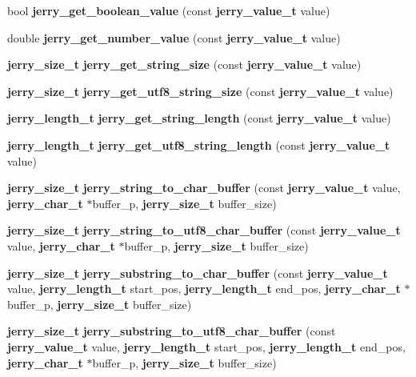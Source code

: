 \begin{DoxyCompactItemize}
\item 
bool \textbf{ jerry\+\_\+get\+\_\+boolean\+\_\+value} (const \textbf{ jerry\+\_\+value\+\_\+t} value)
\item 
\mbox{\label{group___core_ga329c9cb8d7a57c9b643432f729b88438}} 
double {\bfseries jerry\+\_\+get\+\_\+number\+\_\+value} (const \textbf{ jerry\+\_\+value\+\_\+t} value)
\item 
\textbf{ jerry\+\_\+size\+\_\+t} \textbf{ jerry\+\_\+get\+\_\+string\+\_\+size} (const \textbf{ jerry\+\_\+value\+\_\+t} value)
\item 
\mbox{\label{group___core_ga2fbf17ba5843f38650df1130c2d9766d}} 
\textbf{ jerry\+\_\+size\+\_\+t} {\bfseries jerry\+\_\+get\+\_\+utf8\+\_\+string\+\_\+size} (const \textbf{ jerry\+\_\+value\+\_\+t} value)
\item 
\mbox{\label{group___core_ga496e981eaa15cd116d2df6b301f20d35}} 
\textbf{ jerry\+\_\+length\+\_\+t} {\bfseries jerry\+\_\+get\+\_\+string\+\_\+length} (const \textbf{ jerry\+\_\+value\+\_\+t} value)
\item 
\mbox{\label{group___core_gad23af5d2cb6438385239b44e9d99dcc5}} 
\textbf{ jerry\+\_\+length\+\_\+t} {\bfseries jerry\+\_\+get\+\_\+utf8\+\_\+string\+\_\+length} (const \textbf{ jerry\+\_\+value\+\_\+t} value)
\item 
\mbox{\label{group___core_ga1a36fc4a884499edb2e7ad181b518c89}} 
\textbf{ jerry\+\_\+size\+\_\+t} {\bfseries jerry\+\_\+string\+\_\+to\+\_\+char\+\_\+buffer} (const \textbf{ jerry\+\_\+value\+\_\+t} value, \textbf{ jerry\+\_\+char\+\_\+t} $\ast$buffer\+\_\+p, \textbf{ jerry\+\_\+size\+\_\+t} buffer\+\_\+size)
\item 
\mbox{\label{group___core_ga7fa3dfcfa1a0c2b7353448b1e1ea9001}} 
\textbf{ jerry\+\_\+size\+\_\+t} {\bfseries jerry\+\_\+string\+\_\+to\+\_\+utf8\+\_\+char\+\_\+buffer} (const \textbf{ jerry\+\_\+value\+\_\+t} value, \textbf{ jerry\+\_\+char\+\_\+t} $\ast$buffer\+\_\+p, \textbf{ jerry\+\_\+size\+\_\+t} buffer\+\_\+size)
\item 
\mbox{\label{group___core_ga1fd19aabc66899b04bf82c2f516024f7}} 
\textbf{ jerry\+\_\+size\+\_\+t} {\bfseries jerry\+\_\+substring\+\_\+to\+\_\+char\+\_\+buffer} (const \textbf{ jerry\+\_\+value\+\_\+t} value, \textbf{ jerry\+\_\+length\+\_\+t} start\+\_\+pos, \textbf{ jerry\+\_\+length\+\_\+t} end\+\_\+pos, \textbf{ jerry\+\_\+char\+\_\+t} $\ast$buffer\+\_\+p, \textbf{ jerry\+\_\+size\+\_\+t} buffer\+\_\+size)
\item 
\mbox{\label{group___core_gab4dabb314d4c4b4dbc45a4366ae5c544}} 
\textbf{ jerry\+\_\+size\+\_\+t} {\bfseries jerry\+\_\+substring\+\_\+to\+\_\+utf8\+\_\+char\+\_\+buffer} (const \textbf{ jerry\+\_\+value\+\_\+t} value, \textbf{ jerry\+\_\+length\+\_\+t} start\+\_\+pos, \textbf{ jerry\+\_\+length\+\_\+t} end\+\_\+pos, \textbf{ jerry\+\_\+char\+\_\+t} $\ast$buffer\+\_\+p, \textbf{ jerry\+\_\+size\+\_\+t} buffer\+\_\+size)

\end{DoxyCompactItemize}
